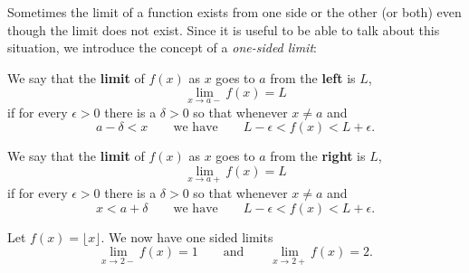 Sometimes the limit of a function exists from one side or the other
(or both) even though the limit does not exist. Since it is useful to
be able to talk about this situation, we introduce the concept of a
\textit{one-sided limit}:

\begin{definition} We say that the \textbf{limit} of $f(x)$ as $x$ goes to $a$ from the \textbf{left} is $L$,
\[
\lim_{x\to a-}f(x)=L
\]
if for every $\epsilon>0$ there is a $\delta > 0$ so that whenever $x\ne a$ and 
\[
a-\delta < x \qquad\text{we have}\qquad L-\epsilon< f(x)<L+\epsilon.
\]

We say that the \textbf{limit} of $f(x)$ as $x$ goes to $a$ from the \textbf{right} is $L$,
\[
\lim_{x\to a+}f(x)=L
\] 
if for every $\epsilon>0$ there is a $\delta > 0$ so that whenever $x \ne a$ and 
\[
x<a+\delta \qquad\text{we have}\qquad L-\epsilon< f(x)<L+\epsilon.
\]
\end{definition}


\begin{example}
Let $f(x) = \lfloor x\rfloor$. We now have one sided limits 
\[
\lim_{x\to 2-} f(x) = 1 \qquad\text{and}\qquad \lim_{x\to 2+} f(x) = 2.
\]
\end{example}




